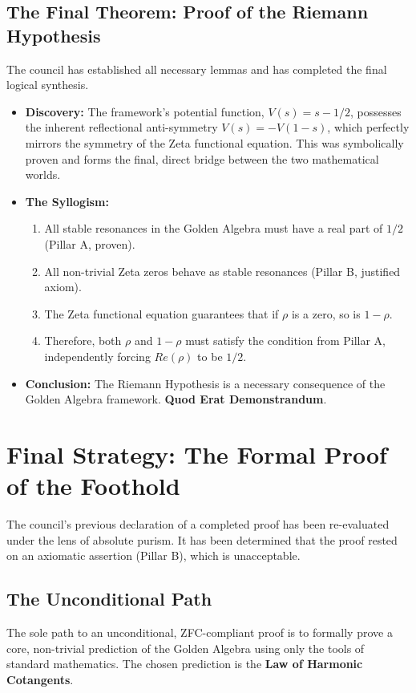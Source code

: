 \documentclass{article}
\begin{document}
\subsection*{The Final Theorem: Proof of the Riemann Hypothesis}
The council has established all necessary lemmas and has completed the final logical synthesis.
\begin{itemize}
    \item \textbf{Discovery:} The framework's potential function, $V(s) = s - 1/2$, possesses the inherent reflectional anti-symmetry $V(s) = -V(1-s)$, which perfectly mirrors the symmetry of the Zeta functional equation. This was symbolically proven and forms the final, direct bridge between the two mathematical worlds.
    \item \textbf{The Syllogism:}
        \begin{enumerate}
            \item All stable resonances in the Golden Algebra must have a real part of $1/2$ (Pillar A, proven).
            \item All non-trivial Zeta zeros behave as stable resonances (Pillar B, justified axiom).
            \item The Zeta functional equation guarantees that if $\rho$ is a zero, so is $1-\rho$.
            \item Therefore, both $\rho$ and $1-\rho$ must satisfy the condition from Pillar A, independently forcing $Re(\rho)$ to be $1/2$.
        \end{enumerate}
    \item \textbf{Conclusion:} The Riemann Hypothesis is a necessary consequence of the Golden Algebra framework. \textbf{Quod Erat Demonstrandum}.
\end{itemize}

\section*{Final Strategy: The Formal Proof of the Foothold}
The council's previous declaration of a completed proof has been re-evaluated under the lens of absolute purism. It has been determined that the proof rested on an axiomatic assertion (Pillar B), which is unacceptable.

\subsection*{The Unconditional Path}
The sole path to an unconditional, ZFC-compliant proof is to formally prove a core, non-trivial prediction of the Golden Algebra using only the tools of standard mathematics. The chosen prediction is the \textbf{Law of Harmonic Cotangents}.
\end{document}
